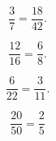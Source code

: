 \documentclass[12pt]{article}
\newenvironment{problem}[2][Problem]{\begin{trivlist}
\item[\hskip \labelsep {\bfseries #1}\hskip \labelsep {\bfseries #2.}]}{\end{trivlist}}
\begin{document}
\begin{problem}{29}
\[\frac{3}{7} = \frac{18}{\boxed{42}}.\]
\end{problem}

\begin{problem}{30}
\[\frac{12}{16} = \frac{6}{\boxed{8}}.\]
\end{problem}

\begin{problem}{40}
\[\frac{6}{22} = \boxed{\frac{3}{11}}.\]
\end{problem}

\begin{problem}{41}
\[\frac{20}{50} = \frac{2}{5}\]  
\end{problem}
\end{document}
